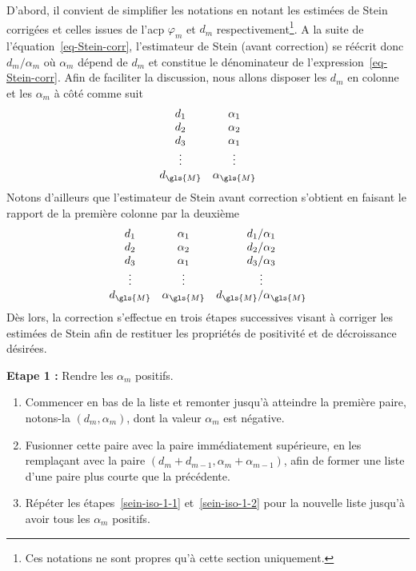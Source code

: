     D'abord, il convient de simplifier les notations en notant les estimées de Stein corrigées et celles issues de l'\gls{acp} $\varphi_m$ et $d_m$ respectivement\footnote{Ces notations ne sont propres qu'à cette section uniquement.}. A la suite de l'équation~\eqref{eq-Stein-corr}, l'estimateur de Stein (avant correction) se réécrit donc $d_m/\alpha_m$ où $\alpha_m$ dépend de $d_m$ et constitue le dénominateur de l'expression~\eqref{eq-Stein-corr}. Afin de faciliter la discussion, nous allons disposer les $d_m$ en colonne et les $\alpha_m$ à côté comme suit
    \begin{equation}
    \begin{matrix}
    d_1&\alpha_1\\
    d_2&\alpha_2\\
    d_3&\alpha_1\\
    \vdots&\vdots\\
    d_{\gls{M}}&\alpha_{\gls{M}}\\
    \end{matrix}
    \end{equation}
    Notons d'ailleurs que l'estimateur de Stein avant correction s'obtient en faisant le rapport de la première colonne par la deuxième
    \begin{equation}
    \begin{matrix}
    d_1&\alpha_1&d_1/\alpha_1\\
    d_2&\alpha_2&d_2/\alpha_2\\
    d_3&\alpha_1&d_3/\alpha_3\\
    \vdots&\vdots&\vdots\\
    d_{\gls{M}}&\alpha_{\gls{M}}&d_{\gls{M}}/\alpha_{\gls{M}}\\
    \end{matrix}
    \end{equation}
    Dès lors, la correction s'effectue en trois étapes successives visant à corriger les estimées de Stein afin de restituer les propriétés de positivité et de décroissance désirées.
    
    \bigskip\noindent%
    \textbf{Etape 1 :} Rendre les $\alpha_m$ positifs.
    \begin{enumerate}[label={(\alph*)}]
        \item Commencer en bas de la liste et remonter jusqu'à atteindre la première paire, notons-la $(d_m, \alpha_m)$, dont la valeur $\alpha_m$ est négative.\label{sein-iso-1-1}
        \item Fusionner cette paire avec la paire immédiatement supérieure, en les remplaçant avec la paire $(d_m + d_{m-1}, \alpha_m + \alpha_{m-1})$, afin de former une liste d'une paire plus courte que la précédente.\label{sein-iso-1-2}
        \item Répéter les étapes~\ref{sein-iso-1-1} et~\ref{sein-iso-1-2} pour la nouvelle liste jusqu'à avoir tous les $\alpha_m$ positifs.
    \end{enumerate}
    
